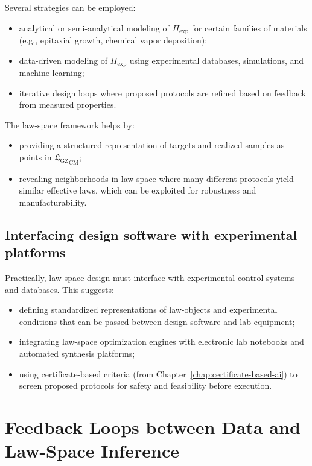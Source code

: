 \documentclass[11pt]{book}
\newcommand{\GZLS}{\ensuremath{\mathfrak{L}_{\mathrm{GZ}}}}
\theoremstyle{plain}
\theoremstyle{definition}
\theoremstyle{remark}
\begin{document}
Several strategies can be employed:
\begin{itemize}
  \item analytical or semi-analytical modeling of $\Pi_{\mathrm{exp}}$
        for certain families of materials (e.g., epitaxial growth,
        chemical vapor deposition);
  \item data-driven modeling of $\Pi_{\mathrm{exp}}$ using
        experimental databases, simulations, and machine learning;
  \item iterative design loops where proposed protocols are refined
        based on feedback from measured properties.
\end{itemize}

The law-space framework helps by:
\begin{itemize}
  \item providing a structured representation of targets and
        realized samples as points in ${\GZLS}_{\mathrm{CM}}$;
  \item revealing neighborhoods in law-space where many different
        protocols yield similar effective laws, which can be
        exploited for robustness and manufacturability.
\end{itemize}

\subsection*{Interfacing design software with experimental platforms}

Practically, law-space design must interface with experimental
control systems and databases. This suggests:
\begin{itemize}
  \item defining standardized representations of law-objects and
        experimental conditions that can be passed between design
        software and lab equipment;
  \item integrating law-space optimization engines with electronic
        lab notebooks and automated synthesis platforms;
  \item using certificate-based criteria (from
        Chapter~\ref{chap:certificate-based-ai}) to screen proposed
        protocols for safety and feasibility before execution.
\end{itemize}

\section{Feedback Loops between Data and Law-Space Inference}
\label{sec:feedback-data-lawspace}
\end{document}

